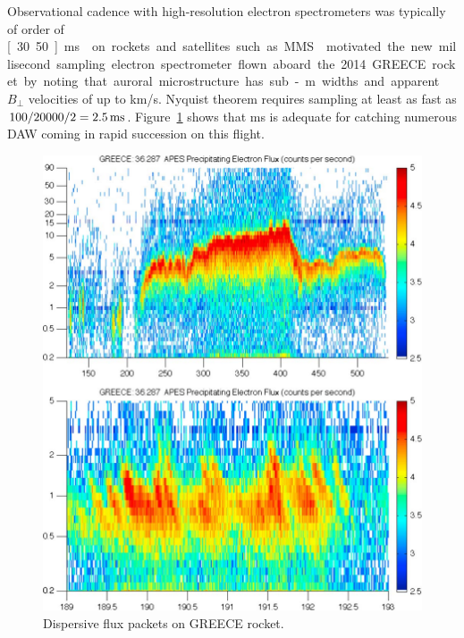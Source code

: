 %
%
Observational cadence with high-resolution electron spectrometers was typically of order of \unit[30..50]{ms} \citep{michell2016} on rockets and satellites such as MMS.
\citet{michell2016} motivated the new millisecond sampling electron spectrometer flown aboard the 2014 GREECE rocket by noting that auroral microstructure has sub-\unit[100]{m} widths and apparent $B_\perp$ velocities of up to \unit[20]{km/s}.
Nyquist theorem requires sampling at least as fast as $100/20000/2 = \unit[2.5]{ms}$.
Figure~\ref{fig:greece-precip} shows that \unit[1]{ms} is adequate for catching numerous DAW coming in rapid succession on this flight.
\begin{figure}
	\includegraphics[width=\linewidth]{../gfx/greece-flux}
	\caption{Dispersive flux packets on GREECE rocket. \citep{michell2016}}
	\label{fig:greece-precip}
\end{figure}
